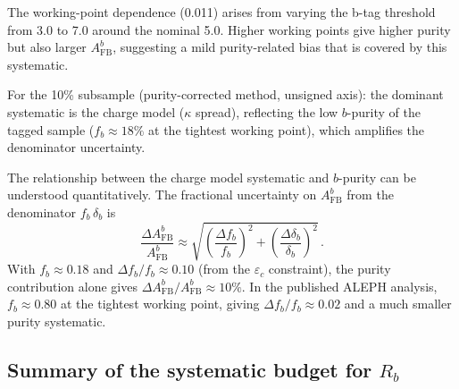 \documentclass[11pt,a4paper]{article}
\begin{document}
The working-point dependence (0.011) arises from varying the b-tag
threshold from 3.0 to 7.0 around the nominal 5.0.
Higher working points give higher purity but also larger $A_\text{FB}^b$,
suggesting a mild purity-related bias that is covered by this systematic.

For the 10\% subsample (purity-corrected method, unsigned axis):
the dominant systematic is the charge model ($\kappa$ spread), reflecting
the low $b$-purity of the tagged sample ($f_b \approx 18\%$ at the
tightest working point), which amplifies the denominator uncertainty.

The relationship between the charge model systematic and $b$-purity
can be understood quantitatively.
The fractional uncertainty on $A_\text{FB}^b$ from the denominator
$f_b\,\delta_b$ is
\begin{equation}
\frac{\Delta A_\text{FB}^b}{A_\text{FB}^b} \approx
\sqrt{\left(\frac{\Delta f_b}{f_b}\right)^2 +
      \left(\frac{\Delta \delta_b}{\delta_b}\right)^2}\,.
\label{eq:afb_frac_unc}
\end{equation}
With $f_b \approx 0.18$ and $\Delta f_b / f_b \approx 0.10$
(from the $\varepsilon_c$ constraint), the purity contribution
alone gives $\Delta A_\text{FB}^b / A_\text{FB}^b \approx 10\%$.
In the published ALEPH analysis, $f_b \approx 0.80$ at the
tightest working point, giving $\Delta f_b / f_b \approx 0.02$
and a much smaller purity systematic.

\subsection{Summary of the systematic budget for $R_b$}
\label{sec:syst-summary}
\end{document}
